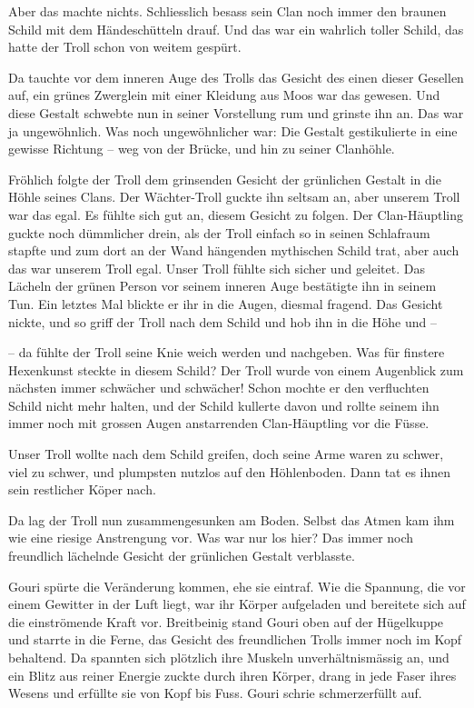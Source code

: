 Aber das machte nichts. Schliesslich besass sein Clan noch immer den braunen Schild mit dem Händeschütteln drauf. Und das war ein wahrlich toller Schild, das hatte der Troll schon von weitem gespürt.

Da tauchte vor dem inneren Auge des Trolls das Gesicht des einen dieser Gesellen auf, ein grünes Zwerglein mit einer Kleidung aus Moos war das gewesen. Und diese Gestalt schwebte nun in seiner Vorstellung rum und grinste ihn an. Das war ja ungewöhnlich. Was noch ungewöhnlicher war: Die Gestalt gestikulierte in eine gewisse Richtung – weg von der Brücke, und hin zu seiner Clanhöhle.
  
Fröhlich folgte der Troll dem grinsenden Gesicht der grünlichen Gestalt in die Höhle seines Clans. Der Wächter-Troll guckte ihn seltsam an, aber unserem Troll war das egal. Es fühlte sich gut an, diesem Gesicht zu folgen. Der Clan-Häuptling guckte noch dümmlicher drein, als der Troll einfach so in seinen Schlafraum stapfte und zum dort an der Wand hängenden mythischen Schild trat, aber auch das war unserem Troll egal. Unser Troll fühlte sich sicher und geleitet. Das Lächeln der grünen Person vor seinem inneren Auge bestätigte ihn in seinem Tun. Ein letztes Mal blickte er ihr in die Augen, diesmal fragend. Das Gesicht nickte, und so griff der Troll nach dem Schild und hob ihn in die Höhe und –

– da fühlte der Troll seine Knie weich werden und nachgeben. Was für finstere Hexenkunst steckte in diesem Schild? Der Troll wurde von einem Augenblick zum nächsten immer schwächer und schwächer! Schon mochte er den verfluchten Schild nicht mehr halten, und der Schild kullerte davon und rollte seinem ihn immer noch mit grossen Augen anstarrenden Clan-Häuptling vor die Füsse.

Unser Troll wollte nach dem Schild greifen, doch seine Arme waren zu schwer, viel zu schwer, und plumpsten nutzlos auf den Höhlenboden. Dann tat es ihnen sein restlicher Köper nach.

Da lag der Troll nun zusammengesunken am Boden. Selbst das Atmen kam ihm wie eine riesige Anstrengung vor. Was war nur los hier? Das immer noch freundlich lächelnde Gesicht der grünlichen Gestalt verblasste.



\trennzeichen



Gouri spürte die Veränderung kommen, ehe sie eintraf. Wie die Spannung, die vor einem Gewitter in der Luft liegt, war ihr Körper aufgeladen und bereitete sich auf die einströmende Kraft vor. Breitbeinig stand Gouri oben auf der Hügelkuppe und starrte in die Ferne, das Gesicht des freundlichen Trolls immer noch im Kopf behaltend. Da spannten sich plötzlich ihre Muskeln unverhältnismässig an, und ein Blitz aus reiner Energie zuckte durch ihren Körper, drang in jede Faser ihres Wesens und erfüllte sie von Kopf bis Fuss. Gouri schrie schmerzerfüllt auf.

